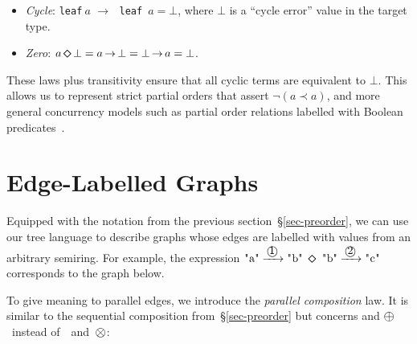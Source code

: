 \documentclass[crc,english]{programming}
\newcommand{\code}[1]{\lstinline[mathescape]|#1|}
\newcommand{\hcode}[1]{{\color{darkblue} \lstinline[keywordstyle={}]|#1|}} %
\newcommand{\hdia}{\,\text{\raisebox{-0.2mm}{\Large\color{darkblue} $\diamond$}}\,}
\newcommand{\add}{\text{\raisebox{-0.1mm}{\large $\oplus$}}}
\newcommand{\mul}{\text{\raisebox{-0.1mm}{\large $\otimes$}}}
\newcommand{\zero}{\raisebox{-0.2mm}{\textcircled{\textsf{0}}}\xspace}
\newcommand{\one}{\raisebox{-0.2mm}{\textcircled{\textsf{\hspace{-0.2mm}1}}}\xspace}
\newcommand{\two}{\raisebox{-0.2mm}{\textcircled{2}}\xspace}
\newcommand{\dia}{\,\text{\raisebox{-0.3mm}{\Large $\diamond$}}\,}
\newcommand{\arr}{\,\text{$\rightarrow$}\,}
\begin{document}
\begin{itemize}
    \item \emph{Cycle}:
    \hcode{leaf}$~a\,\arr\,$\hcode{leaf}~$a = \bot$, where $\bot$ is a
    ``cycle error'' value in the target type.
    \item \emph{Zero}: $a \dia \bot = a \arr \bot = \bot \arr a = \bot$.
\end{itemize}

\noindent
These laws plus transitivity ensure that all cyclic terms are equivalent to
$\bot$. This allows us to represent strict partial orders that assert
$\neg (a \prec a)$, and more general concurrency models such as partial order relations labelled with Boolean predicates~\cite{mokhov2009cpog}.


\section{Edge-Labelled Graphs}\label{sec-labelled}


Equipped with the notation from the previous section~\S\ref{sec-preorder}, we
can use our tree language to describe graphs whose edges are labelled with
values from an arbitrary semiring. For example, the expression
$\text{\code{"a"}} \xrightarrow{\,\one\,} \text{\code{"b"}}\ \dia\ \text{\code{"b"}} \xrightarrow{\,\two\,} \text{\code{"c"}}$
corresponds to the graph below.

\vspace{3mm}
\hfill\hfill
\vspace{3mm}

%

\noindent
To give meaning to parallel edges, we introduce the \emph{parallel composition}
law. It is similar to the sequential composition from~\S\ref{sec-preorder}
but concerns \zero and $\add$~instead of~\one~and~$\mul$:
\end{document}
